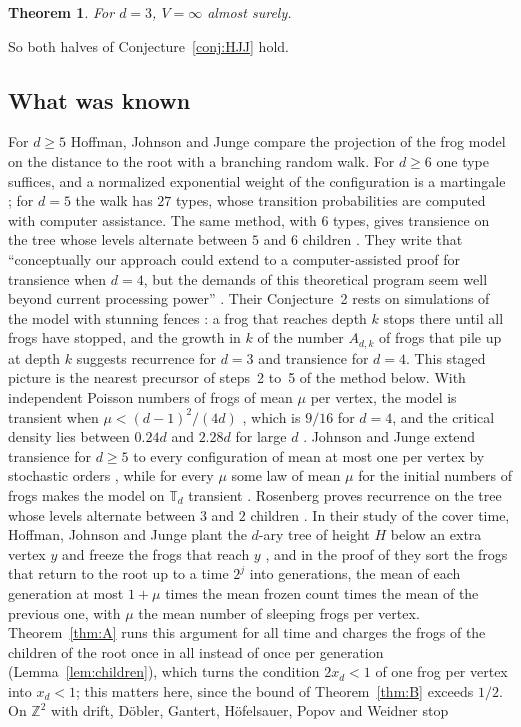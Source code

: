 \documentclass[11pt]{amsart}
\newtheorem{theorem}{Theorem}[section]
\theoremstyle{definition}
\numberwithin{equation}{section}
\newcommand{\lean}[1]{\ignorespaces}
\newcommand{\T}{\mathbb{T}}
\begin{document}
\begin{theorem}\label{thm:three}\lean{FrogModel.recurrent_three, FrogModel.Recurrent, FrogModel.D3.Assembly.recurrent_three_of_m1}
For $d=3$, $V=\infty$ almost surely.
\end{theorem}

So both halves of Conjecture~\ref{conj:HJJ} hold.

\subsection*{What was known}
For $d\ge5$ Hoffman, Johnson and Junge compare the projection of the frog model on the distance to the root with a branching random walk. For $d\ge6$ one type suffices, and a normalized exponential weight of the configuration is a martingale \cite[Proposition~18]{HJJ17}; for $d=5$ the walk has $27$ types, whose transition probabilities are computed with computer assistance. The same method, with $6$ types, gives transience on the tree whose levels alternate between $5$ and $6$ children \cite[Proposition~19]{HJJ17}. They write that ``conceptually our approach could extend to a computer-assisted proof for transience when $d = 4$, but the demands of this theoretical program seem well beyond current processing power'' \cite[p.~2829]{HJJ17}. Their Conjecture~2 rests on simulations of the model with stunning fences \cite[Section~5]{HJJ17}: a frog that reaches depth $k$ stops there until all frogs have stopped, and the growth in $k$ of the number $A_{d,k}$ of frogs that pile up at depth $k$ suggests recurrence for $d=3$ and transience for $d=4$. This staged picture is the nearest precursor of steps~2 to~5 of the method below. With independent Poisson numbers of frogs of mean $\mu$ per vertex, the model is transient when $\mu<(d-1)^2/(4d)$ \cite[Proposition~15]{HJJ16}, which is $9/16$ for $d=4$, and the critical density lies between $0.24d$ and $2.28d$ for large $d$ \cite[Theorem~1]{JJ16}. Johnson and Junge extend transience for $d\ge5$ to every configuration of mean at most one per vertex by stochastic orders \cite[Corollary~7]{JJ18}, while for every $\mu$ some law of mean $\mu$ for the initial numbers of frogs makes the model on $\T_d$ transient \cite[Theorem~1.1]{JR19}. Rosenberg proves recurrence on the tree whose levels alternate between $3$ and $2$ children \cite[Theorem~1.1]{Ros18}. In their study of the cover time, Hoffman, Johnson and Junge plant the $d$-ary tree of height $H$ below an extra vertex $y$ and freeze the frogs that reach $y$ \cite[Proposition~4.3]{HJJ19}, and in the proof of \cite[Corollary~4.4]{HJJ19} they sort the frogs that return to the root up to a time $2^j$ into generations, the mean of each generation at most $1+\mu$ times the mean frozen count times the mean of the previous one, with $\mu$ the mean number of sleeping frogs per vertex. Theorem~\ref{thm:A} runs this argument for all time and charges the frogs of the children of the root once in all instead of once per generation (Lemma~\ref{lem:children}), which turns the condition $2x_d<1$ of one frog per vertex into $x_d<1$; this matters here, since the bound of Theorem~\ref{thm:B} exceeds $1/2$. On $\mathbb{Z}^2$ with drift, D\"obler, Gantert, H\"ofelsauer, Popov and Weidner stop 
\end{document}
